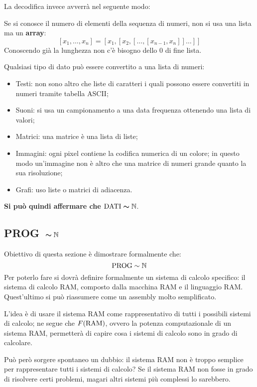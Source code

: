 La decodifica invece avverrà nel seguente modo:
\begin{figure}[H]
    \centering
    
\end{figure}

Se si conosce il numero di elementi della sequenza di numeri, non si usa una lista ma un
\textbf{array}:
$$ [x_1,\dots,x_n] = [x_1,[x_2,[\dots,[x_{n-1},x_n]]\dots]] $$
Conoscendo già la lunghezza non c'è bisogno dello 0 di fine lista.

Qualsiasi tipo di dato può essere convertito a una lista di numeri:
\begin{itemize}
    \item Testi: non sono altro che liste di caratteri i quali possono essere convertiti
        in numeri tramite tabella ASCII;
    \item Suoni: si usa un campionamento a una data frequenza ottenendo una lista di
        valori;
    \item Matrici: una matrice è una lista di liste;
    \item Immagini: ogni pixel contiene la codifica numerica di un colore; in questo modo
    un'immagine non è altro che una matrice di numeri grande quanto la sua risoluzione;
    \item Grafi: uso liste o matrici di adiacenza.
\end{itemize}

\textbf{Si può quindi affermare che $\bm{\text{DATI}\sim\mathbb{N}}$}.

\subsection{\texorpdfstring{PROG\ $\bm{\sim\mathbb{N}}$}{PROG~N}}
Obiettivo di questa sezione è dimostrare formalmente che:
$$ \text{PROG} \sim \mathbb{N} $$
Per poterlo fare si dovrà definire formalmente un sistema di calcolo specifico: il sistema 
di calcolo RAM, composto dalla macchina RAM e il linguaggio RAM. Quest'ultimo si può 
riassumere come un assembly molto semplificato.

L'idea è di usare il sistema RAM come rappresentativo di tutti i possibili sistemi di calcolo;
ne segue che $F(\text{RAM})$, ovvero la potenza computazionale di un sistema RAM, permetterà
di capire cosa i sistemi di calcolo sono in grado di calcolare.

Può però sorgere spontaneo un dubbio: il sistema RAM non è troppo semplice per rappresentare
tutti i sistemi di calcolo? Se il sistema RAM non fosse in grado di risolvere
certi problemi, magari altri sistemi più complessi lo sarebbero.

